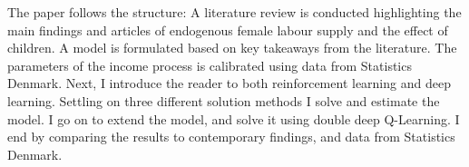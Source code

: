 The paper follows the structure: A literature review is conducted highlighting the main findings and articles of endogenous female labour supply and the effect of children. A model is formulated based on key takeaways from the literature. The parameters of the income process is calibrated using data from Statistics Denmark. Next, I introduce the reader to both reinforcement learning and deep learning. Settling on three different solution methods I solve and estimate the model. I go on to extend the model, and solve it using double deep Q-Learning. I end by comparing the results to contemporary findings, and data from Statistics Denmark.